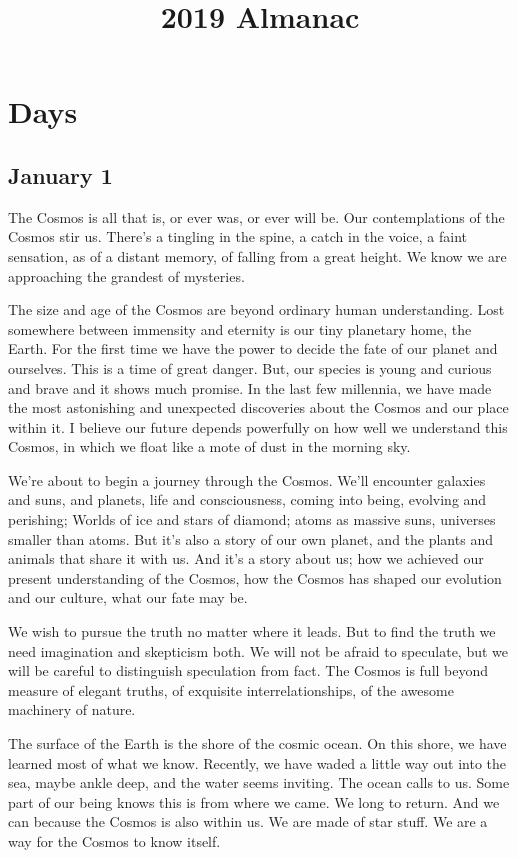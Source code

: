 \documentclass[letterpaper,9pt]{book}
\title{2019 Almanac}
\begin{document}
\maketitle

\chapter{Days}
\section{January 1}

The Cosmos is all that is, or ever was, or ever will be. Our contemplations of the Cosmos stir us. There's a tingling in the spine, a catch in the voice, a faint sensation, as of a distant memory, of falling from a great height. We know we are approaching the grandest of mysteries.

The size and age of the Cosmos are beyond ordinary human understanding. Lost somewhere between immensity and eternity is our tiny planetary home, the Earth. For the first time we have the power to decide the fate of our planet and ourselves. This is a time of great danger. But, our species is young and curious and brave and it shows much promise. In the last few millennia, we have made the most astonishing and unexpected discoveries about the Cosmos and our place within it. I believe our future depends powerfully on how well we understand this Cosmos, in which we float like a mote of dust in the morning sky.

We're about to begin a journey through the Cosmos. We'll encounter galaxies and suns, and planets, life and consciousness, coming into being, evolving and perishing; Worlds of ice and stars of diamond; atoms as massive suns, universes smaller than atoms. But it's also a story of our own planet, and the plants and animals that share it with us. And it's a story about us; how we achieved our present understanding of the Cosmos, how the Cosmos has shaped our evolution and our culture, what our fate may be.

We wish to pursue the truth no matter where it leads. But to find the truth we need imagination and skepticism both. We will not be afraid to speculate, but we will be careful to distinguish speculation from fact. The Cosmos is full beyond measure of elegant truths, of exquisite interrelationships, of the awesome machinery of nature.

The surface of the Earth is the shore of the cosmic ocean. On this shore, we have learned most of what we know. Recently, we have waded a little way out into the sea, maybe ankle deep, and the water seems inviting. The ocean calls to us. Some part of our being knows this is from where we came. We long to return. And we can because the Cosmos is also within us. We are made of star stuff. We are a way for the Cosmos to know itself.
\end{document}
